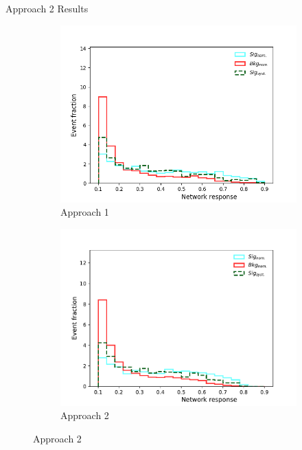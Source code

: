 \begin{frame}{Approach 2 Results}
\vspace{-0.3cm}
    \begin{figure}[htbp]
    \centering
    \begin{subfigure}[b]{0.47\textwidth}
        \includegraphics[width=\textwidth]{app1/half_classic_syst.png}
        \caption{Approach 1}
        \label{fig:simple:final:sepa}
    \end{subfigure}
\quad
    \begin{subfigure}[b]{0.47\textwidth}
        \includegraphics[width=\textwidth]{app2/app2_syst.pdf}
        \caption{Approach 2}
        \label{fig:simple:final:syst}
    \end{subfigure}

\end{figure}
\end{frame}
